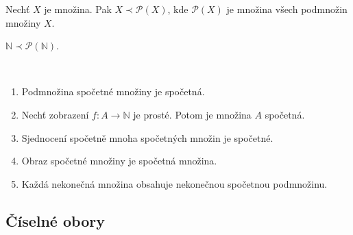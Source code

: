 \begin{veta}[Cantor] \label{veta1.4}
Nechť $X$ je množina. Pak $X\prec \mathcal{P}(X)$, kde $\mathcal{P}(X)$ je množina všech
podmnožin množiny $X$.
\end{veta}

\begin{priklad}
	$\mathbb N \prec \mathcal P (\mathbb N )$.
\end{priklad}

\begin{veta}\label{veta1.5}
\,
\begin{enumerate}
\item[(a)] Podmnožina spočetné množiny je spočetná.
\item[(b)] Nechť zobrazení $f:A\to\mathbb{N}$ je prosté. Potom je množina $A$ spočetná.
\item[(c)] Sjednocení spočetně mnoha spočetných množin je spočetné.
\item[(d)] Obraz spočetné množiny je spočetná množina.
\item[(e)] Každá nekonečná množina obsahuje nekonečnou spočetnou podmnožinu.
\end{enumerate}
\end{veta}

\subsection{Číselné obory}


